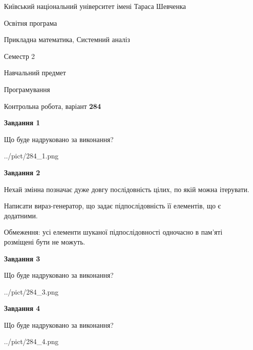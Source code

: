 \documentclass[12pt, ukrainian]{article}
\begin{document}
{{\begin {small}\par
{ \center  Київський національний університет імені Тараса Шевченка \par}
{\parbox {5 cm}{Освітня програма \hfill}{\parbox {8 cm}{Прикладна математика, Системний аналіз \hfill}}\parbox {5 cm}{\hfill Семестр 2}}\par
{\parbox {5 cm} {Навчальний предмет \hfill}\parbox {7 cm}{Програмування \hfill}\parbox {6cm}{\hfill}\par}\vspace{-7pt} \end{small}}{\center Контрольна робота, варіант  \No \textbf
{ 284 }\par}}
{
\begin {large}
{\begin {center}\textbf{Завдання 1}\end {center}}\par
Що буде надруковано за виконання?\par\par
\begin{center}
	{../pict/284_1.png}
\end{center}
\newpage

{\begin {center}\textbf{Завдання 2}\end {center}}\par
Нехай змінна  позначає дуже довгу послідовність цілих, по якій можна ітерувати.

Написати вираз-генератор, що задає підпослідовність її елементів, що є додатни\-ми.

Обмеження: усі елементи шуканої підпослідовності одночасно в пам'яті розміщені бути не можуть.\par
\newpage

{\begin {center}\textbf{Завдання 3}\end {center}}\par
Що буде надруковано за виконання?
\begin{center}
	{../pict/284_3.png}
\end{center}
\newpage

{\begin {center}\textbf{Завдання 4}\end {center}}\par
Що буде надруковано за виконання?\par
\begin{center}
	{../pict/284_4.png}
\end{center}
\newpage


\end{large}}
\end{document}
